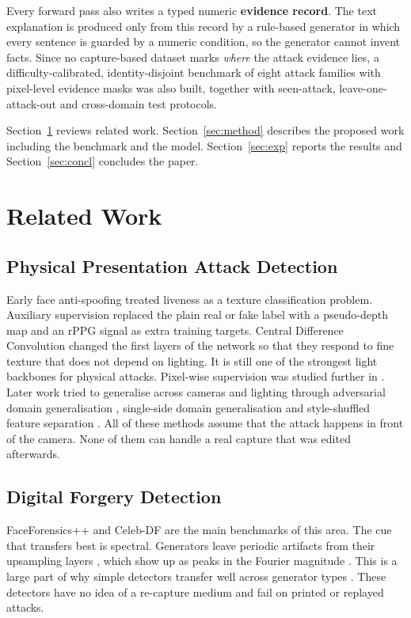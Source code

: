 \documentclass[conference]{IEEEtran}
\newcommand{\sub}[1]{\subsection{\texorpdfstring{\textbf{#1}}{#1}}}
\begin{document}
Every forward pass also writes a typed numeric \textbf{evidence record}. The text
explanation is produced only from this record by a rule-based generator in which every
sentence is guarded by a numeric condition, so the generator cannot invent facts.
Since no capture-based dataset marks \emph{where} the attack evidence lies, a
difficulty-calibrated, identity-disjoint benchmark of eight attack families with
pixel-level evidence masks was also built, together with seen-attack,
leave-one-attack-out and cross-domain test protocols.

Section~\ref{sec:related} reviews related work. Section~\ref{sec:method} describes the
proposed work including the benchmark and the model. Section~\ref{sec:exp} reports the
results and Section~\ref{sec:concl} concludes the paper.

\section{Related Work}\label{sec:related}

\sub{Physical Presentation Attack Detection}
Early face anti-spoofing treated liveness as a texture classification problem.
Auxiliary supervision \cite{liu2018auxiliary} replaced the plain real or fake label
with a pseudo-depth map and an rPPG signal as extra training targets. Central
Difference Convolution \cite{yu2020cdcn} changed the first layers of the network so
that they respond to fine texture that does not depend on lighting. It is still one of
the strongest light backbones for physical attacks. Pixel-wise supervision was studied
further in \cite{yu2021revisiting}. Later work tried to generalise across cameras and
lighting through adversarial domain generalisation \cite{shao2019mada}, single-side
domain generalisation \cite{jia2020ssdg} and style-shuffled feature separation
\cite{wang2022ssan}. All of these methods assume that the attack happens in front of
the camera. None of them can handle a real capture that was edited afterwards.

\sub{Digital Forgery Detection}
FaceForensics++ \cite{rossler2019ff} and Celeb-DF \cite{li2020celebdf} are the main
benchmarks of this area. The cue that transfers best is spectral. Generators leave
periodic artifacts from their upsampling layers \cite{odena2016checkerboard}, which
show up as peaks in the Fourier magnitude \cite{frank2020frequency}. This is a large
part of why simple detectors transfer well across generator types
\cite{wang2020cnnspot}. These detectors have no idea of a re-capture medium and fail
on printed or replayed attacks.
\end{document}

